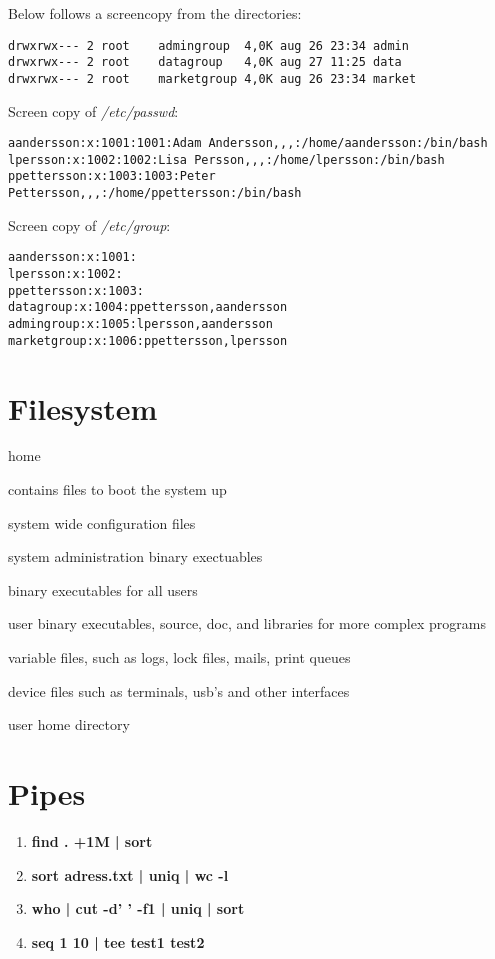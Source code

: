 \documentclass[a4paper,11pt,twoside]{article}
\begin{document}
Below follows a screencopy from the directories:
\begin{verbatim}
drwxrwx--- 2 root    admingroup  4,0K aug 26 23:34 admin
drwxrwx--- 2 root    datagroup   4,0K aug 27 11:25 data
drwxrwx--- 2 root    marketgroup 4,0K aug 26 23:34 market
\end{verbatim}

Screen copy of \textit{/etc/passwd}:
\begin{verbatim}
aandersson:x:1001:1001:Adam Andersson,,,:/home/aandersson:/bin/bash
lpersson:x:1002:1002:Lisa Persson,,,:/home/lpersson:/bin/bash
ppettersson:x:1003:1003:Peter Pettersson,,,:/home/ppettersson:/bin/bash  
\end{verbatim}

Screen copy of \textit{/etc/group}:
\begin{verbatim}
aandersson:x:1001:
lpersson:x:1002:
ppettersson:x:1003:
datagroup:x:1004:ppettersson,aandersson
admingroup:x:1005:lpersson,aandersson
marketgroup:x:1006:ppettersson,lpersson
\end{verbatim}




\section{Filesystem}
\begin{labeling}{home}
\item [/boot] contains files to boot the system up
\item [/etc] system wide configuration files
\item [/sbin] system administration binary exectuables
\item [/bin] binary executables for all users
\item [/usr] user binary executables, source, doc, and libraries for more complex programs
\item [/var] variable files, such as logs, lock files, mails, print queues
\item [/dev] device files such as terminals, usb's and other interfaces
\item [/home] user home directory
\end{labeling}


  
  


\section{Pipes}
\begin{enumerate}
\item \textbf{find . +1M | sort}
\item \textbf{sort adress.txt | uniq | wc -l}
\item \textbf{who | cut -d' ' -f1 | uniq | sort}
\item \textbf{seq 1 10 | tee test1 test2}
\end{enumerate}
  
\end{document}
